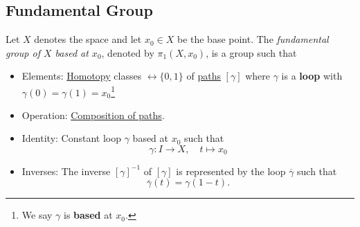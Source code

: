\subsection{Fundamental Group}
\begin{definition}\label{def:fundamental-group}
	Let \(X\) denotes the space and let \(x_0\in X\) be the base point. The \emph{fundamental group of \(X\) based at \(x_0\)},
	denoted by \(\pi_1(X, x_0)\), is a group such that
	\begin{itemize}
		\item Elements: \hyperref[def:homotopy]{Homotopy} classes \(\rel \{0, 1\}\) of \hyperref[def:path]{paths} \([\gamma]\) where \(\gamma\) is a \textbf{loop}
		      with \(\gamma(0) = \gamma(1) = x_0\)\footnote{We say \(\gamma\) is \textbf{based} at \(x_0\).}
		      \begin{center}
		      \end{center}
		\item Operation: \hyperref[def:path-composition]{Composition of paths}.
		\item Identity: Constant loop \(\gamma\) based at \(x_0\) such that
		      \[
			      \gamma\colon I\to X,\quad t\mapsto x_0
		      \]
		\item Inverses: The inverse \([\gamma]^{-1}\) of \([\gamma]\) is represented by the loop \(\overline{\gamma}\) such that
		      \[
			      \overline{\gamma} (t) = \gamma(1-t).
		      \]
		      \begin{center}
		      \end{center}
	\end{itemize}
\end{definition}
